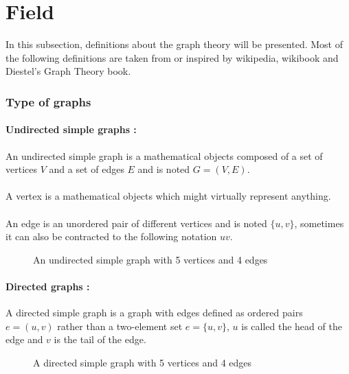 \section{Field}
In this subsection, definitions about the graph theory will be presented. Most
of the following definitions are taken from or inspired by wikipedia,
wikibook and Diestel's Graph Theory book.

\subsubsection{Type of graphs}
\paragraph{Undirected simple graphs :}
An undirected simple graph is a mathematical objects composed of a set of
vertices $V$ and a set of edges $E$ and is noted $G = (V,E)$.

\paragraph{}
A vertex is a mathematical objects which might virtually represent anything.

\paragraph{}
An edge is an unordered pair of different vertices and is noted $\{u,v\}$,
sometimes it can also be contracted to the following notation $uv$.

\begin{figure}[!h]
  \begin{center}
    
  \end{center}
  \caption{An undirected simple graph with 5 vertices and 4 edges}
\end{figure}

\paragraph{Directed graphs :} 
A directed simple graph is a graph with edges defined as ordered pairs
$e = (u,v)$ rather than a two-element set $e = \{u,v\}$, $u$ is called the
head of the edge and $v$ is the tail of the edge.
\begin{figure}[!h]
  \begin{center}
    
  \end{center}
  \caption{A directed simple graph with 5 vertices and 4 edges}
\end{figure}

